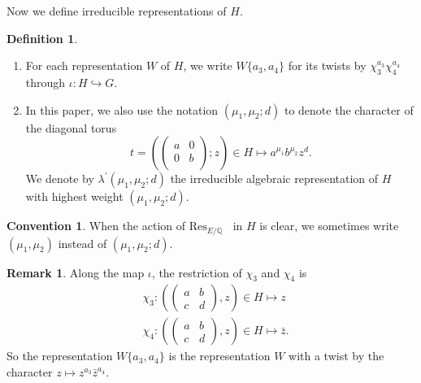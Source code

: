 \documentclass[11pt, a4paper]{amsart}
\theoremstyle{plain}
\theoremstyle{definition}
\newtheorem{definition}[theorem]{Definition}
\newtheorem{remark}[theorem]{Remark}
\newtheorem{convention}[theorem]{Convention}
\numberwithin{equation}{section}
\def\QQ{\mathbb{Q}}
\DeclareMathOperator{\Gm}{\mathrm{G_{m}}}
\begin{document}
Now we define irreducible representations of $H$. 
\begin{definition}
\label{def:repn_H}
    \begin{enumerate}
        \item For each representation $W$ of $H$, we write $W\{a_3,a_4\}$ for its twists by $\chi_3^{a_3}\chi_4^{a_4}$ through $\iota \colon H \hookrightarrow G$. 
        \item In this paper, we also use the notation $(\mu_1, \mu_2; d)$ to denote the character of the diagonal torus
              \begin{equation*}
                   t = (\begin{pmatrix}
                         a & 0 \\
                         0 & b \\
                        \end{pmatrix}; z) \in H \mapsto a^{\mu_1} b^{\mu_2} z^{d}. 
              \end{equation*}
              We denote by $\lambda^{\prime}(\mu_1, \mu_2; d)$ the irreducible algebraic representation of $H$ with highest weight $(\mu_1, \mu_2; d)$.
    \end{enumerate}
\end{definition}

\begin{convention}
    When the action of $\mathrm{Res}_{E/\QQ}\Gm$ in $H$ is clear, we sometimes write $(\mu_1, \mu_2)$ instead of $(\mu_1, \mu_2; d)$. 
\end{convention}

\begin{remark}
    Along the map $\iota$, the restriction of $\chi_3$ and $\chi_4$ is 
    \begin{align*}
        & \chi_3 \colon (\begin{pmatrix}
                    a & b \\
                    c & d
                 \end{pmatrix}, z) \in H \mapsto z \\
         & \chi_4 \colon (\begin{pmatrix}
                    a & b \\
                    c & d
                 \end{pmatrix}, z) \in H \mapsto \bar{z}. 
    \end{align*}
    So the representation $W\{a_3,a_4\}$ is the representation $W$ with a twist by the character $z \mapsto z^{a_3}\bar{z}^{a_4}$. 
\end{remark}
\end{document}
